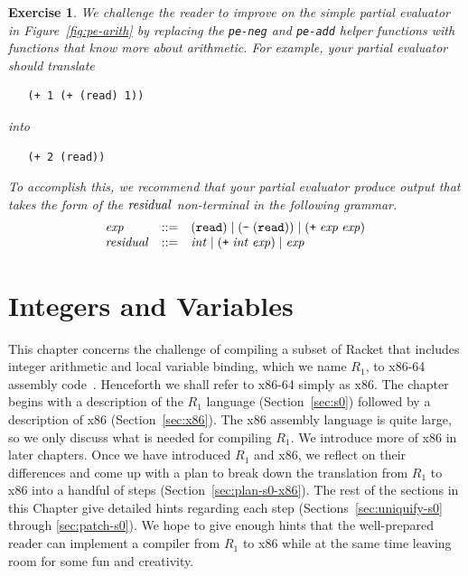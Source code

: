 \documentclass[11pt]{book}
\newcommand{\rn}[1]{{\color{comment-red}{(RRN: #1)}}}
\newcommand{\rn}[1]{}
\newtheorem{exercise}[theorem]{Exercise}
\begin{document}
\rn{Do we like the explicit whitespace?  I've never been fond of it, in part
  because it breaks copy/pasting.  But, then again, so do most of the quotes.}

\begin{exercise}
\normalfont %
We challenge the reader to improve on the simple partial evaluator in
Figure~\ref{fig:pe-arith} by replacing the \texttt{pe-neg} and
\texttt{pe-add} helper functions with functions that know more about
arithmetic. For example, your partial evaluator should translate
\begin{lstlisting}
   (+ 1 (+ (read) 1))
\end{lstlisting}
into
\begin{lstlisting}
   (+ 2 (read))
\end{lstlisting}
To accomplish this, we recommend that your partial evaluator produce
output that takes the form of the $\mathit{residual}$ non-terminal in the
following grammar.
\[
\begin{array}{lcl}
\mathit{exp} &::=& (\texttt{read}) \mid (\texttt{-} \;(\texttt{read})) \mid (\texttt{+} \; \mathit{exp} \; \mathit{exp})\\
\mathit{residual} &::=& \mathit{int} \mid (\texttt{+}\; \mathit{int}\; \mathit{exp}) \mid \mathit{exp}
\end{array}
\]
\end{exercise}


\chapter{Integers and Variables}
\label{ch:int-exp}

This chapter concerns the challenge of compiling a subset of Racket
that includes integer arithmetic and local variable binding, which we
name $R_1$, to x86-64 assembly code~\citep{Intel:2015aa}.  Henceforth
we shall refer to x86-64 simply as x86.  The chapter begins with a
description of the $R_1$ language (Section~\ref{sec:s0}) followed by a
description of x86 (Section~\ref{sec:x86}). The x86 assembly language
is quite large, so we only discuss what is needed for compiling
$R_1$. We introduce more of x86 in later chapters. Once we have
introduced $R_1$ and x86, we reflect on their differences and come up
with a plan to break down the translation from $R_1$ to x86 into a
handful of steps (Section~\ref{sec:plan-s0-x86}).  The rest of the
sections in this Chapter give detailed hints regarding each step
(Sections~\ref{sec:uniquify-s0} through \ref{sec:patch-s0}).  We hope
to give enough hints that the well-prepared reader can implement a
compiler from $R_1$ to x86 while at the same time leaving room for
some fun and creativity.
\end{document}
